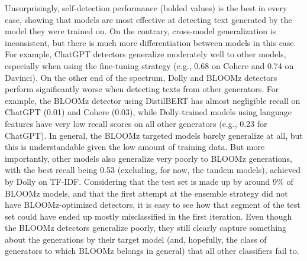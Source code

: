 Unsurprisingly, self-detection performance (bolded values) is the best in every case, showing that models are most effective at detecting text generated by the model they were trained on.
On the contrary, cross-model generalization is inconsistent, but there is much more differentiation between models in this case.
For example, ChatGPT detectors generalize moderately well to other models, especially when using the fine-tuning strategy (e.g., 0.68 on Cohere and 0.74 on Davinci).
On the other end of the spectrum, Dolly and BLOOMz detectors perform significantly worse when detecting texts from other generators.
For example, the BLOOMz detector using DistilBERT has almost negligible recall on ChatGPT (0.01) and Cohere (0.03), while Dolly-trained models using language features have very low recall scores on all other generators (e.g., 0.23 for ChatGPT).
In general, the BLOOMz targeted models barely generalize at all, but this is understandable given the low amount of training data.
But more importantly, other models also generalize very poorly to BLOOMz generations, with the best recall being 0.53 (excluding, for now, the tandem models), achieved by Dolly on TF-IDF.
Considering that the test set is made up by around 9\% of BLOOMz models, and that the first attempt at the ensemble strategy did not have BLOOMz-optimized detectors, it is easy to see how that segment of the test set could have ended up mostly misclassified in the first iteration.
Even though the BLOOMz detectors generalize poorly, they still clearly capture something about the generations by their target model (and, hopefully, the class of generators to which BLOOMz belongs in general) that all other classifiers fail to.

